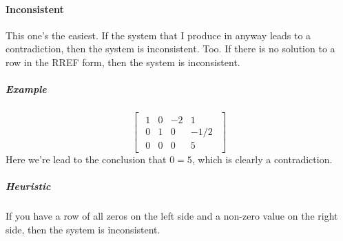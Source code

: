 \documentclass{article}
\begin{document}
            \paragraph{Inconsistent}
                This one's the easiest.
                If the system that I produce in anyway leads to a contradiction,
                then the system is inconsistent. Too. If there is no solution
                to a row in the RREF form, then the system is inconsistent.
                \subparagraph{Example}
                    \[
                    \begin{bmatrix}
                    \begin{array}{ccc|c}
                        1 &  0 &  -2 & 1 \\
                        0 &  1 &  0 & -1/2 \\
                        0 &  0 &  0 & 5
                    \end{array}
                    \end{bmatrix}
                    \]
                    Here we're lead to the conclusion that $0=5$,
                    which is clearly a contradiction.
                \subparagraph{Heuristic}
                    If you have a row of all zeros on the left side
                    and a non-zero value on the right side, then
                    the system is inconsistent.
\end{document}

